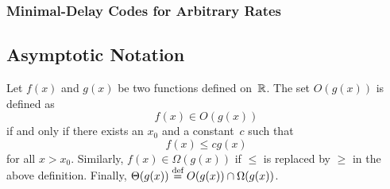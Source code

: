 \subsubsection{Minimal-Delay Codes for Arbitrary Rates}


\begin{subappendices}
  \section{Asymptotic Notation}
  \label{app:asymptotic}

  \begin{definition}
    \label{def:bigo}
    Let $f(x)$ and $g(x)$ be two functions defined on~$\mathbb{R}$. The set $O(g(x))$ is
    defined as
    \begin{equation*}
      f(x) \in O(g(x))
    \end{equation*}
    if and only if there exists an $x_0$ and a constant~$c$ such that
    \begin{equation*}
      f(x) \le c g(x)
    \end{equation*}
    for all $x > x_0$. 
    Similarly, $f(x) \in \Omega(g(x))$ if $\le$ is replaced by $\ge$ in
    the above definition. Finally, $\Theta(g(x)) \stackrel{\text{def}}{=} O(g(x)) \cap
    \Omega(g(x))$.
  \end{definition}

\end{subappendices}
